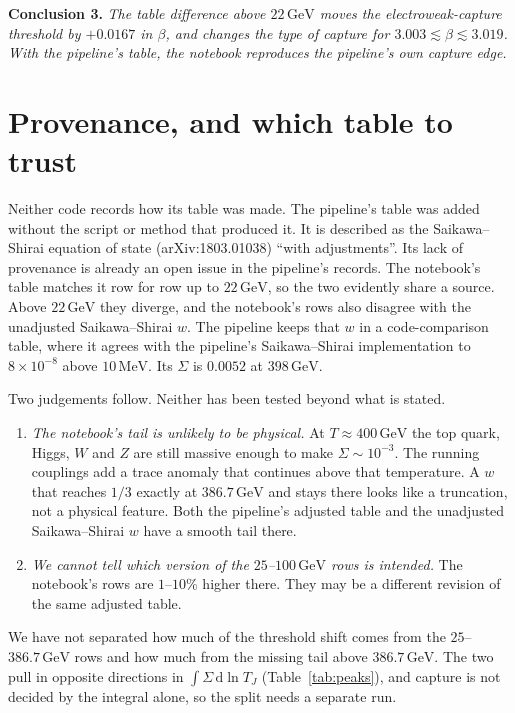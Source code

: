 \documentclass[11pt,a4paper]{article}
\newcommand{\TJ}{T_{J}}
\newcommand{\GeV}{\,\mathrm{GeV}}
\begin{document}
\medskip\noindent
\textbf{Conclusion 3.} \emph{The table difference above $22\GeV$ moves the
electroweak-capture threshold by $+0.0167$ in $\beta$, and changes the type of capture for
$3.003 \lesssim \beta \lesssim 3.019$. With the pipeline's table, the notebook reproduces the
pipeline's own capture edge.}

\section{Provenance, and which table to trust}
\label{sec:provenance}

Neither code records how its table was made. The pipeline's table was added without the
script or method that produced it. It is described as the Saikawa--Shirai equation of state
(arXiv:1803.01038) ``with adjustments''. Its lack of provenance is already an open issue in
the pipeline's records. The notebook's table matches it row for row up to $22\GeV$, so the
two evidently share a source. Above $22\GeV$ they diverge, and the notebook's rows also
disagree with the unadjusted Saikawa--Shirai $w$. The pipeline keeps that $w$ in a
code-comparison table, where it agrees with the pipeline's Saikawa--Shirai implementation to
$8\times10^{-8}$ above $10\,\mathrm{MeV}$. Its $\Sigma$ is $0.0052$ at $398\GeV$.

Two judgements follow. Neither has been tested beyond what is stated.
\begin{enumerate}
\item \emph{The notebook's tail is unlikely to be physical.} At $T \approx 400\GeV$ the top
  quark, Higgs, $W$ and $Z$ are still massive enough to make $\Sigma \sim 10^{-3}$. The
  running couplings add a trace anomaly that continues above that temperature. A $w$ that
  reaches $1/3$ exactly at $386.7\GeV$ and stays there looks like a truncation, not a physical
  feature. Both the pipeline's adjusted table and the unadjusted Saikawa--Shirai $w$ have a
  smooth tail there.
\item \emph{We cannot tell which version of the $25$--$100\GeV$ rows is intended.} The
  notebook's rows are $1$--$10\%$ higher there. They may be a different revision of the same
  adjusted table.
\end{enumerate}
We have not separated how much of the threshold shift comes from the $25$--$386.7\GeV$ rows
and how much from the missing tail above $386.7\GeV$. The two pull in opposite directions in
$\int\Sigma\,\mathrm{d}\ln\TJ$ (Table~\ref{tab:peaks}), and capture is not decided by the
integral alone, so the split needs a separate run.
\end{document}
